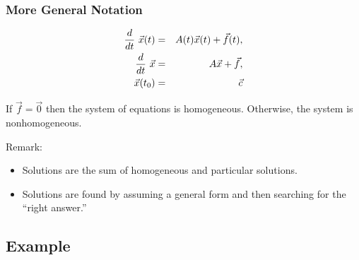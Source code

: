 \begin{frame}
  \frametitle{More General Notation}

  \begin{eqnarray*}
    \deriv{~}{t} \vec{x}(t) & = & A(t) \vec{x}(t) + \vec{f}(t), \\
    \deriv{~}{t} \vec{x} & = & A \vec{x} + \vec{f}, \\
    \vec{x}(t_0) & = & \vec{c} 
  \end{eqnarray*}

  If $\vec{f}=\vec{0}$ then the system of equations is
  {\color{red}homogeneous}. 
  Otherwise, the system is {\color{red}nonhomogeneous}.

  {\color{blue}Remark:} 
  \begin{itemize}
  \item Solutions are the sum of homogeneous and particular solutions.
  \item Solutions are found by assuming a general form and then
    searching for the ``right answer.''
  \end{itemize}

\end{frame}

\subsection{Example}

